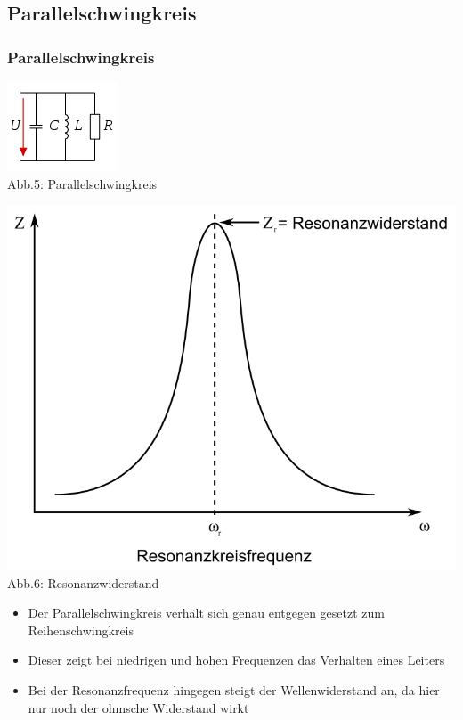 \subsection*{Parallel\-schwing\-kreis}
\begin{frame}
\frametitle{Parallelschwingkreis}
\begin{center}
	\begin{minipage}{0.4\textwidth}
	\includegraphics[scale=1]{a04/Parallelschw.png}\\
	\tiny{Abb.5: Parallelschwingkreis \cite{wmen}}
	\end{minipage}
	\begin{minipage}{0.4\textwidth}
	\includegraphics[scale=0.2]{a04/ParallelschwSig.png}\\
	\tiny{Abb.6: Resonanzwiderstand \cite{wmen}} 
	\end{minipage}
\end{center}
\begin{itemize}
	\item Der Parallelschwingkreis verhält sich genau entgegen gesetzt zum Reihenschwingkreis
	\item Dieser zeigt bei niedrigen und hohen Frequenzen das Verhalten eines Leiters
	\item Bei der Resonanzfrequenz hingegen steigt der Wellenwiderstand an, da hier nur noch der ohmsche Widerstand wirkt
\end{itemize}
\end{frame}


